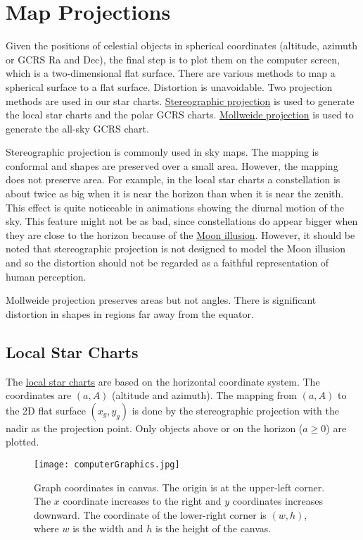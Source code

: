 \documentclass[12pt]{article}
\begin{document}
\section{Map Projections}
\label{sec:maps}

Given the positions of celestial objects in spherical coordinates (altitude, 
azimuth or GCRS Ra and Dec), the final step is to plot them on the computer 
screen, which is a two-dimensional flat surface. There are various methods 
to map a spherical surface to a flat surface. Distortion is unavoidable. 
Two projection methods are used in our star charts. 
\href{https://en.wikipedia.org/wiki/Stereographic_projection}{Stereographic projection} 
is used to generate the local star charts and the polar GCRS charts. 
\href{https://en.wikipedia.org/wiki/Mollweide_projection}{Mollweide projection} 
is used to generate the all-sky GCRS chart. 

Stereographic projection is commonly used in sky maps. The mapping is 
conformal and shapes are preserved over a small area. However, 
the mapping does not preserve area. For example, in the local star charts 
a constellation is about twice as big when it is near the horizon than 
when it is near the zenith. This effect is quite noticeable in animations 
showing the diurnal motion of the sky. This feature might not be as bad, 
since constellations do appear bigger when they are close to the horizon 
because of the \href{https://www.skyandtelescope.com/observing/moon-illusion-confusion11252015/}{Moon illusion}. 
However, it should be noted that stereographic projection is not 
designed to model the Moon illusion and so the distortion should not be regarded as 
a faithful representation of human perception.

Mollweide projection preserves areas but not angles. There is significant 
distortion in shapes in regions far away from the equator.

\subsection{Local Star Charts}

The \href{../sidereal.html}{local star charts} are based on the horizontal 
coordinate system. The coordinates are $(a,A)$ (altitude and azimuth). The mapping 
from $(a,A)$ to the 2D flat surface $(x_g,y_g)$ is done by the stereographic projection 
with the nadir as the projection point. 
Only objects above or on the horizon ($a \geq 0$) are plotted.

\begin{figure}[h]
\begin{center}
\texttt{[image: computerGraphics.jpg]}
\end{center}
\caption{Graph coordinates in canvas. The origin is at the upper-left corner. 
The $x$ coordinate increases to the right and $y$ coordinates increases downward. 
The coordinate of the lower-right corner is $(w,h)$, where $w$ is the width 
and $h$ is the height of the canvas.}
\label{fig:computerGraphics}
\end{figure}
\end{document}
